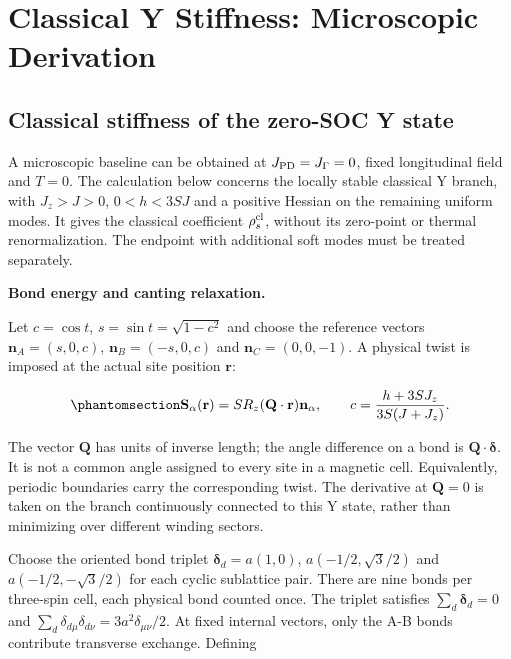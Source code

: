 \clearpage

\section{Classical Y Stiffness: Microscopic
Derivation}\label{sec-nbcp-stiffness-appendix}

\subsection{Classical stiffness of the zero-SOC Y
state}\label{sec-nbcp-y-stiffness}

A microscopic baseline can be obtained at \(J_{\rm PD}=J_\Gamma=0\),
fixed longitudinal field and \(T=0\). The calculation below concerns the
locally stable classical Y branch, with \(J_z>J>0\), \(0<h<3SJ\) and a
positive Hessian on the remaining uniform modes. It gives the classical
coefficient \(\rho_s^{\rm cl}\), without its zero-point or thermal
renormalization. The endpoint with additional soft modes must be treated
separately.

\textbf{Bond energy and canting relaxation.}

Let \(c=\cos t\), \(s=\sin t=\sqrt{1-c^2}\) and choose the reference
vectors \(\mathbf n_A=(s,0,c)\), \(\mathbf n_B=(-s,0,c)\) and
\(\mathbf n_C=(0,0,-1)\). A physical twist is imposed at the actual site
position \(\mathbf r\):

\begin{equation}\phantomsection\label{eq-nbcp-y-spatial-twist}{
\mathbf S_\alpha(\mathbf r)
=S R_z(\mathbf Q\cdot\mathbf r)\mathbf n_\alpha,
\qquad
c=\frac{h+3SJ_z}{3S(J+J_z)}.
}\end{equation}

The vector \(\mathbf Q\) has units of inverse length; the angle
difference on a bond is \(\mathbf Q\cdot\boldsymbol\delta\). It is not a
common angle assigned to every site in a magnetic cell. Equivalently,
periodic boundaries carry the corresponding twist. The derivative at
\(\mathbf Q=0\) is taken on the branch continuously connected to this Y
state, rather than minimizing over different winding sectors.

Choose the oriented bond triplet \(\boldsymbol\delta_d=a(1,0)\),
\(a(-1/2,\sqrt3/2)\) and \(a(-1/2,-\sqrt3/2)\) for each cyclic
sublattice pair. There are nine bonds per three-spin cell, each physical
bond counted once. The triplet satisfies \(\sum_d\boldsymbol\delta_d=0\)
and \(\sum_d\delta_{d\mu}\delta_{d\nu}=3a^2\delta_{\mu\nu}/2\). At fixed
internal vectors, only the A-B bonds contribute transverse exchange.
Defining

